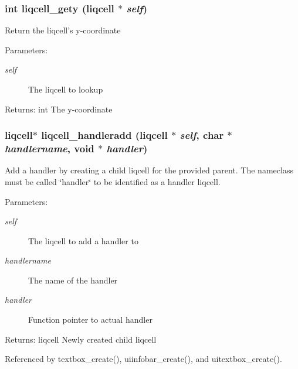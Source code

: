 \subsubsection[{liqcell\_\-gety}]{\setlength{\rightskip}{0pt plus 5cm}int liqcell\_\-gety (liqcell $\ast$ {\em self})}\label{d5/da2/liqcell_8c_4a977d16847eeb69393d3ead6e9a6f50}


Return the liqcell's y-coordinate \begin{Desc}
\item[Parameters:]
\begin{description}
\item[{\em self}]The liqcell to lookup \end{description}
\end{Desc}
\begin{Desc}
\item[Returns:]int The y-coordinate \end{Desc}
\subsubsection[{liqcell\_\-handleradd}]{\setlength{\rightskip}{0pt plus 5cm}liqcell$\ast$ liqcell\_\-handleradd (liqcell $\ast$ {\em self}, \/  char $\ast$ {\em handlername}, \/  void $\ast$ {\em handler})}\label{d5/da2/liqcell_8c_b2045008c4c69ad93f43b04e6b87f6ea}


Add a handler by creating a child liqcell for the provided parent. The nameclass must be called \char`\"{}handler\char`\"{} to be identified as a handler liqcell.

\begin{Desc}
\item[Parameters:]
\begin{description}
\item[{\em self}]The liqcell to add a handler to \item[{\em handlername}]The name of the handler \item[{\em handler}]Function pointer to actual handler \end{description}
\end{Desc}
\begin{Desc}
\item[Returns:]liqcell Newly created child liqcell \end{Desc}


Referenced by textbox\_\-create(), uiinfobar\_\-create(), and uitextbox\_\-create().

